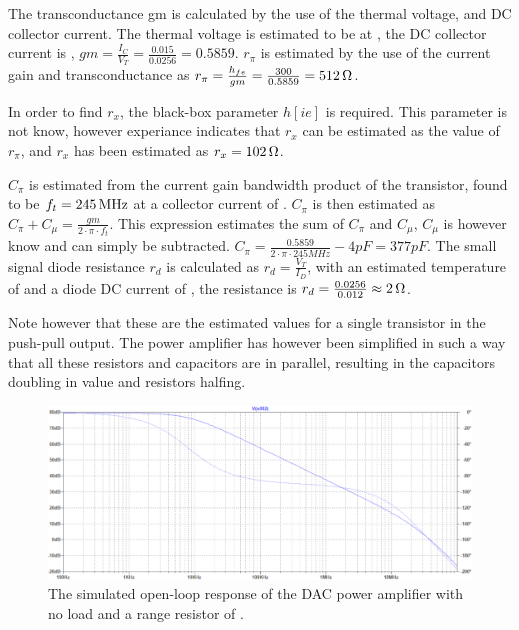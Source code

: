 The transconductance gm is calculated by the use of the thermal voltage, and DC collector current. The thermal voltage is estimated to be  at , the DC collector current is , $gm = \frac{I_C}{V_T} = \frac{0.015}{0.0256} = 0.5859$. $r_\pi$ is estimated by the use of the current gain and transconductance as $r_\pi = \frac{h_{fe}}{gm} = \frac{300}{0.5859} = \SI{512}{\ohm}$. 

In order to find $r_x$, the black-box parameter $h[ie]$ is required. This parameter is not know, however experiance indicates that $r_x$ can be estimated as  the value of $r_\pi$, and $r_x$ has been estimated as $r_x = \SI{102}{\ohm}$.

$C_\pi$ is estimated from the current gain bandwidth product of the transistor, found to be $f_t = \SI{245}{\mega\hertz}$ at a collector current of . $C_\pi$ is then estimated as $C_\pi +C_\mu = \frac{gm}{2\cdot\pi\cdot f_t}$. This expression estimates the sum of $C_\pi$ and $C_\mu$, $C_\mu$ is however know and can simply be subtracted. $C_\pi = \frac{0.5859}{2\cdot\pi\cdot 245 MHz} -4 pF = 377 pF$. The small signal diode resistance $r_d$ is calculated as $r_d = \frac{V_T}{I_D}$, with an estimated temperature of  and a diode DC current of , the resistance is $r_d = \frac{0.0256}{0.012} \approx \SI{2}{\ohm}$. 

Note however that these are the estimated values for a single transistor in the push-pull output. The power amplifier has however been simplified in such a way that all these resistors and capacitors are in parallel, resulting in the capacitors doubling in value and resistors halfing.

\begin{figure}[H]
    \centering
    \includegraphics[clip, trim=0 0 0 0, width=1\textwidth]{Sections/7_SystemDesign/Figures/7_1_1_5_DAC_PWR_AMP_NO_LOAD.pdf}
    \caption{The simulated open-loop response of the DAC power amplifier with no load and a range resistor of .}
    \label{fig_7_1_1_5_DAC_POWER_AMP_SIM_NL}
\end{figure}


